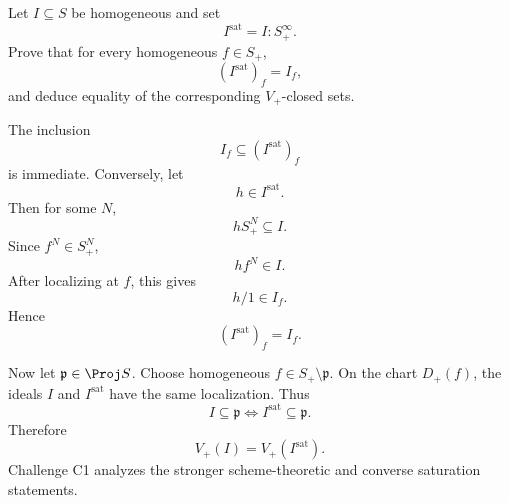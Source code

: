 \begin{problem}\label{prob:vi35-18}
Let \(I\subseteq S\) be homogeneous and set
\[
I^{\mathrm{sat}}=I:S_+^\infty.
\]
Prove that for every homogeneous \(f\in S_+\),
\[
(I^{\mathrm{sat}})_f=I_f,
\]
and deduce equality of the corresponding \(V_+\)-closed sets.

\end{problem}

\ifdefined\FullProblemDossiers
\begin{solution}
The inclusion
\[
I_f\subseteq(I^{\mathrm{sat}})_f
\]
is immediate. Conversely, let
\[
h\in I^{\mathrm{sat}}.
\]
Then for some \(N\),
\[
hS_+^N\subseteq I.
\]
Since \(f^N\in S_+^N\),
\[
hf^N\in I.
\]
After localizing at \(f\), this gives
\[
h/1\in I_f.
\]
Hence
\[
\boxed{(I^{\mathrm{sat}})_f=I_f}.
\]

Now let \(\mathfrak p\in\Proj S\). Choose homogeneous \(f\in S_+\setminus\mathfrak p\). On the chart \(D_+(f)\),
the ideals \(I\) and \(I^{\mathrm{sat}}\) have the same localization. Thus
\[
I\subseteq\mathfrak p
\iff
I^{\mathrm{sat}}\subseteq\mathfrak p.
\]
Therefore
\[
\boxed{V_+(I)=V_+(I^{\mathrm{sat}})}.
\]
Challenge C1 analyzes the stronger scheme-theoretic and converse saturation statements.
\end{solution}
\fi
